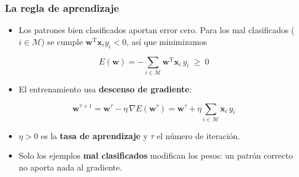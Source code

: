 \documentclass[aspectratio=169, 10pt]{beamer}
\newcommand{\formula}[1]{%
	\begin{tcolorbox}[colback=UCMBlue!8, colframe=UCMBlue, arc=4pt,
		boxsep=2pt, left=6pt, right=6pt, top=3pt, bottom=3pt]
		#1
	\end{tcolorbox}
}
\begin{document}
\begin{frame}
\frametitle{La regla de aprendizaje}
\begin{itemize}
	\item Los patrones bien clasificados aportan error cero. Para los mal clasificados ($i \in \mathcal M$) se cumple $\mathbf w^{\mathrm{T}}\mathbf x_i y_i < 0$, as\'i que minimizamos
\end{itemize}
\formula{
\[
E(\mathbf w) = -\sum_{i \in \mathcal M} \mathbf w^{\mathrm{T}}\mathbf x_i\, y_i \;\geq\; 0
\]}
\pause
\begin{itemize}
	\item El entrenamiento usa \textbf{descenso de gradiente}:
\end{itemize}
\formula{
\[
\mathbf w^{\tau+1} = \mathbf w^{\tau} - \eta\,\nabla E(\mathbf w^{\tau})
= \mathbf w^{\tau} + \eta \sum_{i \in \mathcal M} \mathbf x_i\, y_i
\]}
\pause
\begin{itemize}
	\item $\eta > 0$ es la \textbf{tasa de aprendizaje} y $\tau$ el n\'umero de iteraci\'on.
	\item Solo los ejemplos \textbf{mal clasificados} modifican los pesos: un patr\'on correcto no aporta nada al gradiente.
\end{itemize}
\end{frame}
\end{document}

